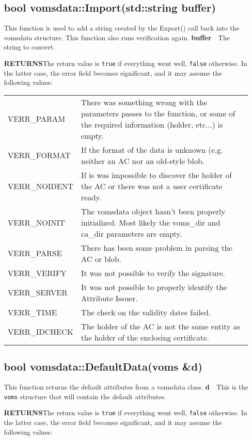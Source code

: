 \documentclass[a4paper]{book}
\newcommand{\return}{\textbf{RETURNS}\newline}
\newcommand{\parameter}[2]{\newline\textbf{#1}\ \ #2}
\begin{document}
\subsection{bool vomsdata::Import(std::string buffer)}

This function is used to add a string created by the Export() call
back into the vomsdata structure.  This function also runs
verification again.
\parameter{buffer}{The string to convert.}

\return The return value is \texttt{true} if everything went well,
\texttt{false} otherwise.  In the latter case, the error field becomes
significant, and it may assume the following values:


\bigskip\begin{tabular}{lp{3in}}
VERR\_PARAM   & There was something wrong with the parameters passes to
the function, or some of the required information (holder, etc...) is
empty.\\ 
VERR\_FORMAT  & If the format of the data is unknown (e.g. neither an
AC nor an old-style blob.\\
VERR\_NOIDENT & If is was impossible to discover the holder of the
AC or there was not a user certificate ready.\\ 
VERR\_NOINIT  & The vomsdata object hasn't been properly initialized.
Most likely the voms\_dir and ca\_dir parameters are empty.\\
VERR\_PARSE   & There has been some problem in parsing the AC or
blob.\\
VERR\_VERIFY  & It was not possible to verify the signature.\\
VERR\_SERVER  & It was not possible to properly identify the Attribute
Issuer.\\
VERR\_TIME    & The check on the validity dates failed.\\
VERR\_IDCHECK & The holder of the AC is not the same entity as the
holder of the enclosing certificate.\\
\end{tabular}

\subsection{bool vomsdata::DefaultData(voms \&d)}

This function returns the default attributes from a vomsdata class.
\parameter{d}{This is the \texttt{voms} structure that will contain
the default attributes.}

\return The return value is \texttt{true} if everything went well,
\texttt{false} otherwise.  In the latter case, the error field becomes
significant, and it may assume the following values:
\end{document}
